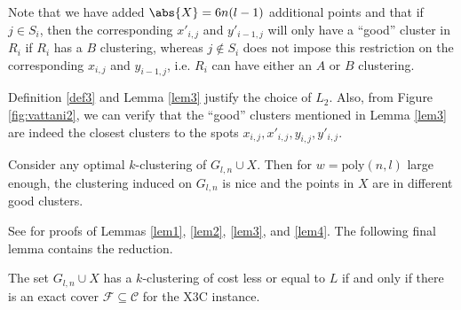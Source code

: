 Note that we have added $\abs{X}=6n(l-1)$ additional points and that if $j\in S_i$, then the corresponding $x'_{i,j}$ and $y'_{i-1,j}$ will only have a ``good'' cluster in $R_i$ if $R_i$ has a $B$ clustering, whereas $j\not\in S_i$ does not impose this restriction on the corresponding $x_{i,j}$ and $y_{i-1,j}$, i.e. $R_i$ can have either an $A$ or $B$ clustering.

Definition \ref{def3} and Lemma \ref{lem3} justify the choice of $L_2$. Also, from Figure \ref{fig:vattani2}, we can verify that the ``good'' clusters mentioned in Lemma \ref{lem3} are indeed the closest clusters to the spots $x_{i,j},x'_{i,j},y_{i,j},y'_{i,j}$.

\begin{lemma}\label{lem4}
Consider any optimal $k$-clustering of $G_{l,n}\cup X$. Then for $w=\text{poly}(n,l)$ large enough, the clustering induced on $G_{l,n}$ is nice and the points in $X$ are in different good clusters.
\end{lemma}

See \cite{vattani} for proofs of Lemmas \ref{lem1}, \ref{lem2}, \ref{lem3}, and \ref{lem4}. The following final lemma contains the reduction.

\begin{lemma}\label{lem5}
The set $G_{l,n}\cup X$ has a $k$-clustering of cost less or equal to $L$ if and only if there is an exact cover $\mathcal{F}\subseteq \mathcal{C}$ for the X3C instance.
\end{lemma}

